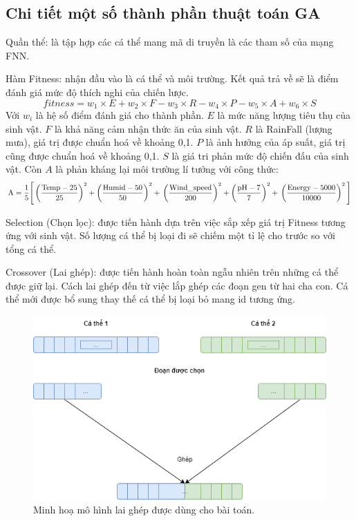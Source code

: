 \subsection{Chi tiết một số thành phần thuật toán GA}
	Quần thể: là tập hợp các cá thể mang mã di truyền là các tham số của mạng FNN.
	
	Hàm Fitness: nhận đầu vào là cá thể và môi trường. Kết quả trả về sẽ là điểm đánh giá mức độ thích nghi của chiến lược. 
	\begin{equation}
		fitness = w_1 \times E + w_2 \times F - w_3 \times R - w_4 \times P - w_5 \times A + w_6 \times S
	\end{equation}
	Với $w_i$ là hệ số điểm đánh giá cho thành phần. $E$ là mức năng lượng tiêu thụ của sinh vật. $F$ là khả năng cảm nhận thức ăn của sinh vật. $R$ là RainFall (lượng mưa), giá trị được chuẩn hoá về khoảng 0,1. $P$ là ảnh hưởng của áp suất, giá trị cũng được chuẩn hoá về khoảng 0,1.
	$S$ là giá tri phản mức độ chiến đấu của sinh vật. Còn $A$ là phản kháng lại môi trường lí tưởng với công thức:
	\begin{equation}
	\text{A} =
	\frac{1}{5} \Bigg[
	\left( \frac{\text{Temp} - 25}{25} \right)^2 +
	\left( \frac{\text{Humid} - 50}{50} \right)^2 + \\
	\left( \frac{\text{Wind\_speed}}{200} \right)^2 +
	\left( \frac{\text{pH} - 7}{7} \right)^2 + \\
	\left( \frac{\text{Energy} - 5000}{10000} \right)^2
	\Bigg]
	\end{equation}
	
	Selection (Chọn lọc): được tiến hành dựa trên việc sắp xếp giá trị Fitness tương ứng với sinh vật. Số lượng cá thể bị loại đi sẽ chiếm một tỉ lệ cho trước so với tổng cá thể.
	
	Crossover (Lai ghép): được tiến hành hoàn toàn ngẫu nhiên trên những cá thể được giữ lại. Cách lai ghép đến từ việc lắp ghép các đoạn gen từ hai cha con. Cá thể mới được bổ sung thay thế cá thể bị loại bỏ mang id tương ứng.
	\begin{figure}[h]
		\centering
		\includegraphics[scale=0.5]{figures/crossover.png}
		\caption{Minh hoạ mô hình lai ghép được dùng cho bài toán.}
	\end{figure}
	
